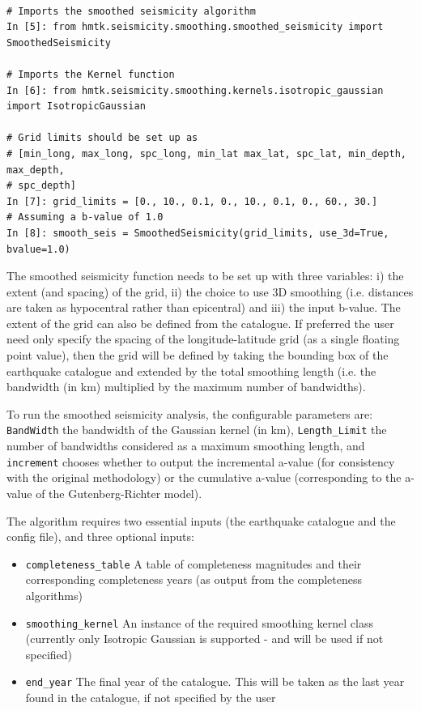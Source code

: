 \begin{Verbatim}[frame=single, commandchars=\\\{\}, fontsize=\scriptsize]

# Imports the smoothed seismicity algorithm
In [5]: from hmtk.seismicity.smoothing.smoothed_seismicity import SmoothedSeismicity

# Imports the Kernel function
In [6]: from hmtk.seismicity.smoothing.kernels.isotropic_gaussian import IsotropicGaussian

# Grid limits should be set up as 
# [min_long, max_long, spc_long, min_lat max_lat, spc_lat, min_depth, max_depth,
# spc_depth]
In [7]: grid_limits = [0., 10., 0.1, 0., 10., 0.1, 0., 60., 30.]
# Assuming a b-value of 1.0
In [8]: smooth_seis = SmoothedSeismicity(grid_limits, use_3d=True, bvalue=1.0)

\end{Verbatim}

The smoothed seismicity function needs to be set up with three variables: i) the extent (and spacing) of the grid, ii) the choice to use 3D smoothing (i.e. distances are taken as hypocentral rather than epicentral) and iii) the input b-value. The extent of the grid can also be defined from the catalogue. If preferred the user need only specify the spacing of the longitude-latitude grid (as a single floating point value), then the grid will be defined by taking the bounding box of the earthquake catalogue and extended by the total smoothing length (i.e. the bandwidth (in km) multiplied by the maximum number of bandwidths). 

To run the smoothed seismicity analysis, the configurable parameters are: \verb=BandWidth= the bandwidth of the Gaussian kernel (in km), \verb=Length_Limit= the number of bandwidths considered as a maximum smoothing length, and \verb=increment= chooses whether to output the incremental a-value (for consistency with the original \cite{frankel1995} methodology) or the cumulative a-value (corresponding to the a-value of the Gutenberg-Richter model).


The algorithm requires two essential inputs (the earthquake catalogue and the config file), and three optional inputs:

\begin{itemize}
\item \verb=completeness_table= A table of completeness magnitudes and their corresponding completeness years (as output from the completeness algorithms)

\item \verb=smoothing_kernel= An instance of the required smoothing
kernel class (currently only Isotropic Gaussian is supported - and will be used if not specified)

\item \verb=end_year= The final year of the catalogue. This will be taken as the last year found in the catalogue, if not specified by the user
\end{itemize}

